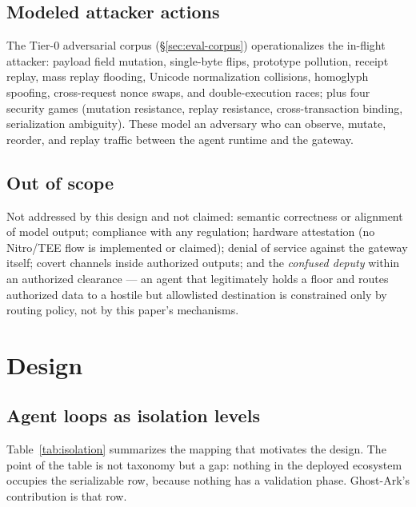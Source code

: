 \documentclass[10pt,twocolumn,letterpaper]{article}
\newcommand{\ghostark}{Ghost-Ark}
\begin{document}
\subsection{Modeled attacker actions}
\label{sec:modeled}

The Tier-0 adversarial corpus (\S\ref{sec:eval-corpus}) operationalizes the
in-flight attacker: payload field mutation, single-byte flips, prototype
pollution, receipt replay, mass replay flooding, Unicode normalization
collisions, homoglyph spoofing, cross-request nonce swaps, and
double-execution races; plus four security games (mutation resistance,
replay resistance, cross-transaction binding, serialization ambiguity).
These model an adversary who can observe, mutate, reorder, and replay
traffic between the agent runtime and the gateway.

\subsection{Out of scope}
\label{sec:oos}

Not addressed by this design and not claimed: semantic correctness or
alignment of model output; compliance with any regulation; hardware
attestation (no Nitro/TEE flow is implemented or claimed); denial of service
against the gateway itself; covert channels inside authorized outputs; and
the \emph{confused deputy} within an authorized clearance --- an agent that
legitimately holds a floor and routes authorized data to a hostile but
allowlisted destination is constrained only by routing policy, not by this
paper's mechanisms.

\section{Design}
\label{sec:design}

\subsection{Agent loops as isolation levels}
\label{sec:isolation}

Table~\ref{tab:isolation} summarizes the mapping that motivates the design.
The point of the table is not taxonomy but a gap: nothing in the deployed
ecosystem occupies the serializable row, because nothing has a validation
phase. \ghostark{}'s contribution is that row.
\end{document}
